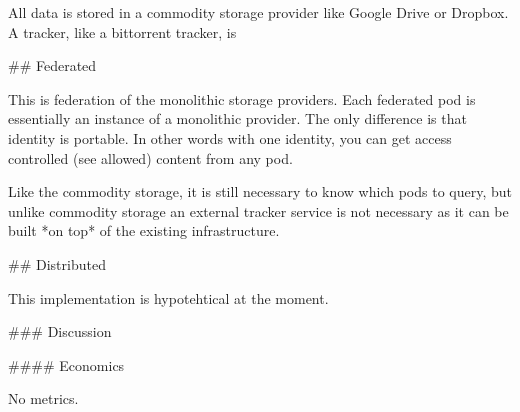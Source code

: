 All data is stored in a commodity storage provider like Google Drive or Dropbox.
A tracker, like a bittorrent tracker, is

## Federated

This is federation of the monolithic storage providers.
Each federated pod is essentially an instance of a monolithic provider.
The only difference is that identity is portable.
In other words with one identity, you can get access controlled (see allowed) content
from any pod.

Like the commodity storage, it is still necessary to know which pods to query,
but unlike commodity storage an external tracker service is not necessary as it
can be built *on top* of the existing infrastructure.

## Distributed

This implementation is hypotehtical at the moment.


### Discussion

#### Economics

No metrics.
